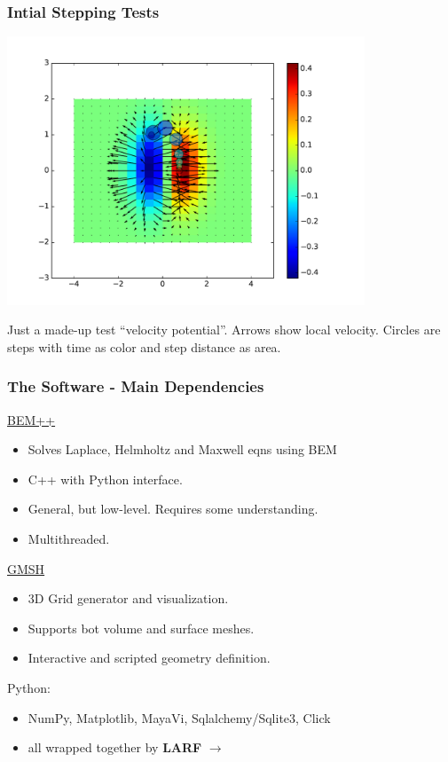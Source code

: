 \documentclass[xcolor=dvipsnames]{beamer}
\begin{document}
\begin{frame}
  \frametitle{Intial Stepping Tests}
  \begin{center}
    \includegraphics[width=0.8\textwidth,clip,trim=0 10mm 0 10mm]{initial_stepping_test2.pdf}    
  \end{center}

  \scriptsize
  Just a made-up test ``velocity potential''.  Arrows show local
  velocity.  Circles are steps with time as color and step distance as
  area.

\end{frame}


\begin{frame}
  \frametitle{The Software - Main Dependencies}

  \href{http://www.bempp.org/}{BEM++}
  \begin{itemize}
  \item Solves Laplace, Helmholtz and Maxwell eqns using BEM
  \item C++ with Python interface.
  \item General, but low-level.  Requires some understanding.
  \item Multithreaded.
  \end{itemize}

  \href{http://gmsh.info}{GMSH}
  \begin{itemize}
  \item 3D Grid generator and visualization.
  \item Supports bot volume and surface meshes.
  \item Interactive and scripted geometry definition.
  \end{itemize}

  Python:
  \begin{itemize}
  \item NumPy, Matplotlib, MayaVi, Sqlalchemy/Sqlite3, Click
  \item all wrapped together by \textbf{LARF} $\rightarrow$
  \end{itemize}
\end{frame}
\end{document}

